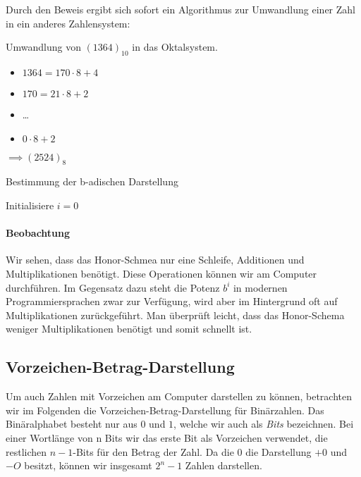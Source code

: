 Durch den Beweis ergibt sich sofort ein Algorithmus zur Umwandlung einer Zahl in ein anderes Zahlensystem:
\begin{example}
Umwandlung von $(1364)_{10}$ in das Oktalsystem.
\begin{itemize}
	\item $1364 = 170 \cdot 8 +4$
	\item $170 = 21 \cdot 8 +2$
	\item \ldots
	\item $0 \cdot 8 + 2$
\end{itemize}
$\implies (2524)_8$
\end{example}

\begin{algorithm}[H]
 \caption{Bestimmung der b-adischen Darstellung}
 Initialisiere $i=0$ \\
 \end{algorithm}

\paragraph{Beobachtung}
Wir sehen, dass das Honor-Schmea nur eine Schleife, Additionen und Multiplikationen benötigt. 
Diese Operationen können wir am Computer durchführen. 
Im Gegensatz dazu steht die Potenz $b^{i}$ in modernen Programmiersprachen zwar zur Verfügung, wird aber im Hintergrund oft auf Multiplikationen zurückgeführt.
Man überprüft leicht, dass das Honor-Schema weniger Multiplikationen benötigt und somit schnellt ist.
\subsection{Vorzeichen-Betrag-Darstellung}
Um auch Zahlen mit Vorzeichen am Computer darstellen zu können, betrachten wir im Folgenden die Vorzeichen-Betrag-Darstellung für Binärzahlen.
Das Binäralphabet besteht nur aus $0$ und $1$, welche wir auch als \emph{Bits} bezeichnen.
Bei einer Wortlänge von n Bits wir das erste Bit als Vorzeichen verwendet, die restlichen $n-1$-Bits für den Betrag der Zahl. Da die 0 die Darstellung $+0$ und $-O$ besitzt, können wir insgesamt $2^{n}-1$ Zahlen darstellen.

